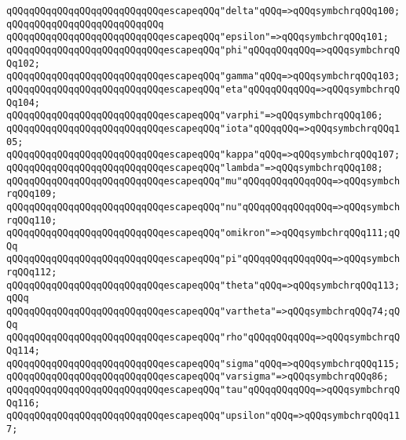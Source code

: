 \verb|qQQqqQQqqQQqqQQqqQQqqQQqqQQqescapeqQQq"delta"qQQq=>qQQqsymbchrqQQq100;qQQqqQQqqQQqqQQqqQQqqQQqqQQq|\newline
\verb|qQQqqQQqqQQqqQQqqQQqqQQqqQQqescapeqQQq"epsilon"=>qQQqsymbchrqQQq101;|\newline
\verb|qQQqqQQqqQQqqQQqqQQqqQQqqQQqescapeqQQq"phi"qQQqqQQqqQQq=>qQQqsymbchrqQQq102;|\newline
\verb|qQQqqQQqqQQqqQQqqQQqqQQqqQQqescapeqQQq"gamma"qQQq=>qQQqsymbchrqQQq103;|\newline
\verb|qQQqqQQqqQQqqQQqqQQqqQQqqQQqescapeqQQq"eta"qQQqqQQqqQQq=>qQQqsymbchrqQQq104;|\newline
\verb|qQQqqQQqqQQqqQQqqQQqqQQqqQQqescapeqQQq"varphi"=>qQQqsymbchrqQQq106;|\newline
\verb|qQQqqQQqqQQqqQQqqQQqqQQqqQQqescapeqQQq"iota"qQQqqQQq=>qQQqsymbchrqQQq105;|\newline
\verb|qQQqqQQqqQQqqQQqqQQqqQQqqQQqescapeqQQq"kappa"qQQq=>qQQqsymbchrqQQq107;|\newline
\verb|qQQqqQQqqQQqqQQqqQQqqQQqqQQqescapeqQQq"lambda"=>qQQqsymbchrqQQq108;|\newline
\verb|qQQqqQQqqQQqqQQqqQQqqQQqqQQqescapeqQQq"mu"qQQqqQQqqQQqqQQq=>qQQqsymbchrqQQq109;|\newline
\verb|qQQqqQQqqQQqqQQqqQQqqQQqqQQqescapeqQQq"nu"qQQqqQQqqQQqqQQq=>qQQqsymbchrqQQq110;|\newline
\verb|qQQqqQQqqQQqqQQqqQQqqQQqqQQqescapeqQQq"omikron"=>qQQqsymbchrqQQq111;qQQq|\newline
\verb|qQQqqQQqqQQqqQQqqQQqqQQqqQQqescapeqQQq"pi"qQQqqQQqqQQqqQQq=>qQQqsymbchrqQQq112;|\newline
\verb|qQQqqQQqqQQqqQQqqQQqqQQqqQQqescapeqQQq"theta"qQQq=>qQQqsymbchrqQQq113;qQQq|\newline
\verb|qQQqqQQqqQQqqQQqqQQqqQQqqQQqescapeqQQq"vartheta"=>qQQqsymbchrqQQq74;qQQq|\newline
\verb|qQQqqQQqqQQqqQQqqQQqqQQqqQQqescapeqQQq"rho"qQQqqQQqqQQq=>qQQqsymbchrqQQq114;|\newline
\verb|qQQqqQQqqQQqqQQqqQQqqQQqqQQqescapeqQQq"sigma"qQQq=>qQQqsymbchrqQQq115;|\newline
\verb|qQQqqQQqqQQqqQQqqQQqqQQqqQQqescapeqQQq"varsigma"=>qQQqsymbchrqQQq86;|\newline
\verb|qQQqqQQqqQQqqQQqqQQqqQQqqQQqescapeqQQq"tau"qQQqqQQqqQQq=>qQQqsymbchrqQQq116;|\newline
\verb|qQQqqQQqqQQqqQQqqQQqqQQqqQQqescapeqQQq"upsilon"qQQq=>qQQqsymbchrqQQq117;|\newline
